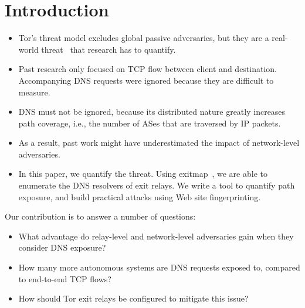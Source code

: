 \section{Introduction}
\label{sec:introduction}

\begin{itemize}
	\item Tor's threat model excludes global passive adversaries, but they are a
		real-world threat~\cite{torstinks} that research has to quantify.

	\item Past research only focused on TCP flow between client and destination.
		Accompanying DNS requests were ignored because they are difficult to
		measure.

	\item DNS must not be ignored, because its distributed nature greatly
		increases path coverage, i.e., the number of ASes that are traversed by
		IP packets.

	\item As a result, past work might have underestimated the impact of
		network-level adversaries.

	\item In this paper, we quantify the threat.  Using
		exitmap~\cite{Winter2014b}, we are able to enumerate the DNS resolvers
		of exit relays.  We write a tool to quantify path exposure, and build
		practical attacks using Web site fingerprinting.
\end{itemize}

Our contribution is to answer a number of questions:
\begin{itemize}
	\item What advantage do relay-level and network-level adversaries gain when
		they consider DNS exposure?

	\item How many more autonomous systems are DNS requests exposed to, compared
		to end-to-end TCP flows?

	\item How should Tor exit relays be configured to mitigate this issue?
\end{itemize}

